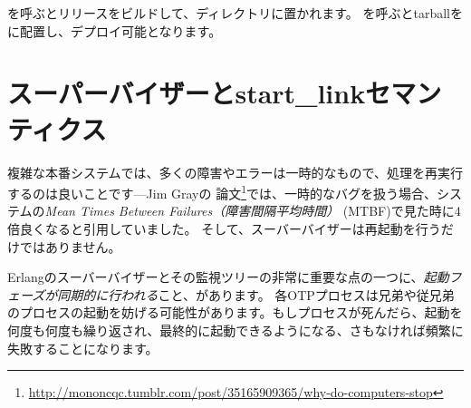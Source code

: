 を呼ぶとリリースをビルドして、ディレクトリに置かれます。
を呼ぶとtarballをに配置し、デプロイ可能となります。

\section{スーパーバイザーとstart\_linkセマンティクス}
\label{sec:supervisors-and-start-link-semantics}

複雑な本番システムでは、多くの障害やエラーは一時的なもので、処理を再実行するのは良いことです---Jim Grayの
論文\footnote{\href{http://mononcqc.tumblr.com/post/35165909365/why-do-computers-stop}{http://mononcqc.tumblr.com/post/35165909365/why-do-computers-stop}}では、一時的なバグを扱う場合、システムの\emph{Mean Times Between Failures（障害間隔平均時間）} (MTBF)で見た時に4倍良くなると引用していました。
そして、スーバーバイザーは再起動を行うだけではありません。

Erlangのスーバーバイザーとその監視ツリーの非常に重要な点の一つに、\emph{起動フェーズが同期的に行われる}こと、があります。
各OTPプロセスは兄弟や従兄弟のプロセスの起動を妨げる可能性があります。もしプロセスが死んだら、起動を何度も何度も繰り返され、最終的に起動できるようになる、さもなければ頻繁に失敗することになります。

